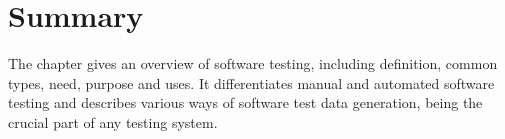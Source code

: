 
\section{Summary}
The chapter gives an overview of software testing, including definition, common types, need, purpose and uses. It differentiates manual and automated software testing and describes various ways of software test data generation, being the crucial part of any testing system.





